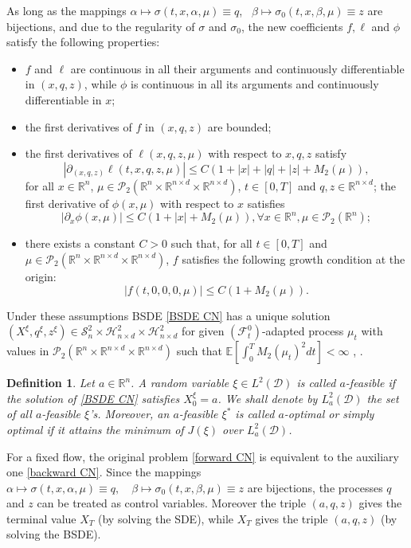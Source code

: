 \documentclass[11pt,a4paper]{article}
\newtheorem{defi}[theo]{Definition}
\begin{document}
As long as the mappings 
$\alpha \mapsto \sigma(t,x, \alpha, \mu)\equiv q$, \ 
$\beta \mapsto \sigma_0(t,x, \beta, \mu)\equiv z $
are bijections, and due to the regularity of $\sigma$ and  $\sigma_0$, the new coefficients $f, \ell$ and $\phi$ satisfy the following properties:
\begin{itemize}
\item[(B1)] $f$ and $\ell$ are  continuous in all their arguments and continuously differentiable in $(x, q, z)$, while $\phi$ is continuous in all its arguments and continuously differentiable in $x$;
\item[(B2)] the first derivatives of $f$ in $(x,q,z)$ are bounded; 
\item[(B3)] the first derivatives of \( \ell(x, q, z, \mu) \) with respect to \( x, q, z\) satisfy
\[
|\partial_{(x,q,z)} \ell(t, x, q, z, \mu)| \leq C \left(1 + |x| + |q| + |z| + M_2(\mu)\right),
\]
for all $ x \in \mathbb{R}^n$, $\mu \in \mathcal{P}_2(\mathbb R^n \times \mathbb R^{n\times d} \times \mathbb R^{n\times d})$, $t \in [0,T]$ and $q, z \in \mathbb{R}^{n \times d}$; 
the first derivative of \( \phi(x, \mu) \) with respect to \( x \) satisfies
\[
|\partial_x \phi(x, \mu)| \leq C \left(1 + |x| + M_2(\mu)\right), \forall  x \in \mathbb{R}^n, \mu \in \mathcal{P}_2(\mathbb R^n);
\]
\item[(B4)] there exists a constant $C > 0$ such that, for all $t \in [0,T]$ and $\mu \in  \mathcal{P}_2(\mathbb R^n \times \mathbb R^{n\times d} \times \mathbb R^{n\times d})$, $f$ satisfies the following growth condition at the origin:
\[
|f(t,0,0,0,\mu)| \leq C(1 + M_2(\mu)).
\]
\end{itemize}
Under  these assumptions BSDE \eqref{BSDE CN} has a unique solution $(X^\xi, q^\xi, z^\xi)  \in \mathcal S^2 _n \times  \mathcal H^2 _{n\times d}\times \mathcal H^2 _{n\times d}$  for  given $(\mathcal F_t ^0)$-adapted process $\mu_t$ with values in $\mathcal{P}_2(\mathbb{R}^n\times \mathbb{R}^{n\times d} \times \mathbb{R}^{n\times d})$ such that $\mathbb E \left[\int_0^T M_2(\mu_t)^2 dt\right]<\infty$  \cite[Theorem 2.1, p.18]{Karoui Peng Quenez}, \cite[Theorem 3.1, p.58]{Pardoux}. 

\begin{defi}
 Let $a\in \mathbb R^n$. A random variable $\xi \in L^2 (\mathcal D)$ is called $a$-feasible if the solution of \eqref{BSDE CN} satisfies $X_0^\xi=a$. We shall denote by $L^2 _a(\mathcal D)$ the set of all $a$-feasible $\xi$'s. Moreover, an $a$-feasible $\xi^*$ is called $a$-optimal or simply optimal if it attains the minimum of $J(\xi)$ over $L^2 _a(\mathcal D)$. 
\end{defi}
For a fixed flow, the original problem \eqref{forward CN} is equivalent to the auxiliary one \eqref{backward CN}.  Since the mappings $\alpha \mapsto \sigma(t,x, \alpha, \mu) \equiv q, \quad \beta \mapsto \sigma_0(t,x, \beta, \mu)\equiv z$ are bijections, the processes $q$ and $z$
can be treated as control variables. Moreover the triple $(a, q, z)$ gives the terminal value $X_T$ (by solving the SDE), while $X_T$ gives the triple $(a,q,z)$ (by solving the BSDE). 
\end{document}
